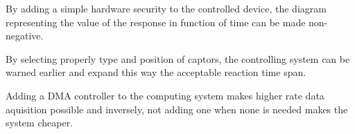 \documentclass[../main.tex]{subfiles}
\begin{document}
\begin{exmp}
By adding a simple hardware security to the controlled device, the diagram representing the value of the response in function of time can be made non-negative.
\end{exmp}

\begin{exmp}
By selecting properly type and position of captors, the controlling system can be warned earlier and expand this way the acceptable reaction time span.
\end{exmp}

\begin{exmp}
Adding a DMA controller to the computing system makes higher rate data aquisition possible and inversely, not adding one when none is needed makes the system cheaper.
\end{exmp}
\end{document}
